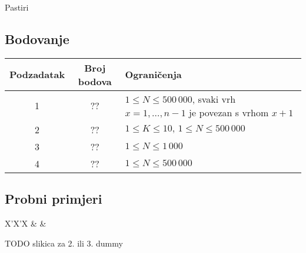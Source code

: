 \begin{statement}[
  problempoints=100,
  timelimit=1 sekunda,
  memorylimit=512 MiB,
]{Pastiri}
\subsection*{Bodovanje}
{\renewcommand{\arraystretch}{1.4}
  \setlength{\tabcolsep}{6pt}
  \begin{tabular}{ccl}
 Podzadatak & Broj bodova & Ograničenja \\ \midrule
  1 & ?? & $1 \le N \le 500\,000$, svaki vrh $x = 1, \dots, n-1$ je povezan s vrhom $x + 1$\\
  2 & ?? & $1 \le K \le 10, \, 1 \le N \le 500\,000$ \\
  3 & ?? & $1 \le N \le 1\,000$ \\
  4 & ?? & $1 \le N \le 500\,000$ \\
\end{tabular}}

\subsection*{Probni primjeri}
\begin{tabularx}{\textwidth}{X'X'X}
 &
 &
\end{tabularx}
TODO slikica za 2. ili 3. dummy

\end{statement}

